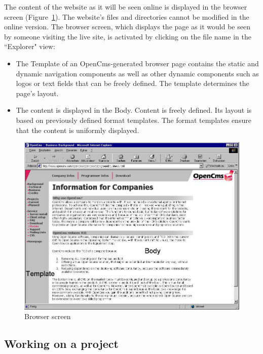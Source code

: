 The content of the website as it will be seen online is displayed
in the browser screen (Figure~\ref{browserscreen}). The website's
files and directories cannot be modified in the online version.
The browser screen, which displays the page as it would be seen by
someone visiting the live site, is activated by clicking on the
file name in the ``Explorer" view:

\begin{itemize}
\item The Template of an OpenCms-generated browser page contains the
static and dynamic navigation components as well as other dynamic
components such as logos or text fields that can be freely
defined. The template determines the page's layout.
\item The content is displayed in the Body. Content is freely defined. Its
layout is based on previously defined format templates. The format
templates ensure that the content is uniformly displayed.
\end{itemize}

\begin{figure}[!hbt]
\begin{center}
\includegraphics[width=\sgw]
                   {pics/usermanual/browserScreen}
\caption[Browser screen]
           {Browser screen}
\label{browserscreen}
\end{center}
\end{figure}

\subsection{Working on a project}


